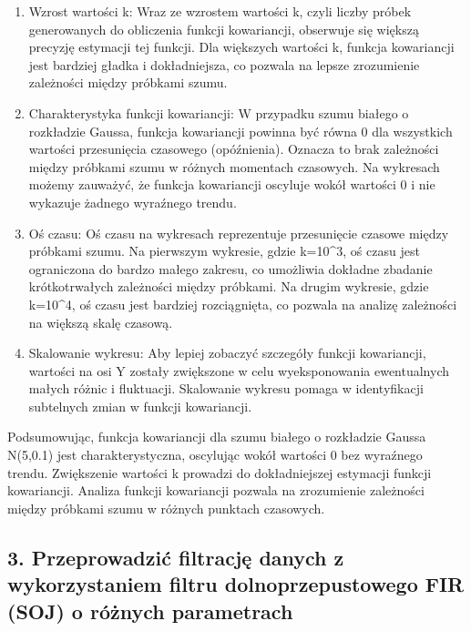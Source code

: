 \documentclass[11pt]{article}
\providecommand{\tightlist}{%
      \setlength{\itemsep}{0pt}\setlength{\parskip}{0pt}}
\begin{document}
    \begin{enumerate}
\def\labelenumi{\arabic{enumi}.}
\tightlist
\item
  Wzrost wartości k: Wraz ze wzrostem wartości k, czyli liczby próbek
  generowanych do obliczenia funkcji kowariancji, obserwuje się większą
  precyzję estymacji tej funkcji. Dla większych wartości k, funkcja
  kowariancji jest bardziej gładka i dokładniejsza, co pozwala na lepsze
  zrozumienie zależności między próbkami szumu.
\item
  Charakterystyka funkcji kowariancji: W przypadku szumu białego o
  rozkładzie Gaussa, funkcja kowariancji powinna być równa 0 dla
  wszystkich wartości przesunięcia czasowego (opóźnienia). Oznacza to
  brak zależności między próbkami szumu w różnych momentach czasowych.
  Na wykresach możemy zauważyć, że funkcja kowariancji oscyluje wokół
  wartości 0 i nie wykazuje żadnego wyraźnego trendu.
\item
  Oś czasu: Oś czasu na wykresach reprezentuje przesunięcie czasowe
  między próbkami szumu. Na pierwszym wykresie, gdzie k=10\^{}3, oś
  czasu jest ograniczona do bardzo małego zakresu, co umożliwia dokładne
  zbadanie krótkotrwałych zależności między próbkami. Na drugim
  wykresie, gdzie k=10\^{}4, oś czasu jest bardziej rozciągnięta, co
  pozwala na analizę zależności na większą skalę czasową.
\item
  Skalowanie wykresu: Aby lepiej zobaczyć szczegóły funkcji kowariancji,
  wartości na osi Y zostały zwiększone w celu wyeksponowania
  ewentualnych małych różnic i fluktuacji. Skalowanie wykresu pomaga w
  identyfikacji subtelnych zmian w funkcji kowariancji.
\end{enumerate}

Podsumowując, funkcja kowariancji dla szumu białego o rozkładzie Gaussa
N(5,0.1) jest charakterystyczna, oscylując wokół wartości 0 bez
wyraźnego trendu. Zwiększenie wartości k prowadzi do dokładniejszej
estymacji funkcji kowariancji. Analiza funkcji kowariancji pozwala na
zrozumienie zależności między próbkami szumu w różnych punktach
czasowych.

    \hypertarget{przeprowadziux107-filtracjux119-danych-z-wykorzystaniem-filtru-dolnoprzepustowego-fir-soj-o-ruxf3ux17cnych-parametrach}{%
\subsection{3. Przeprowadzić filtrację danych z wykorzystaniem filtru
dolnoprzepustowego FIR (SOJ) o różnych
parametrach}\label{przeprowadziux107-filtracjux119-danych-z-wykorzystaniem-filtru-dolnoprzepustowego-fir-soj-o-ruxf3ux17cnych-parametrach}}
\end{document}
